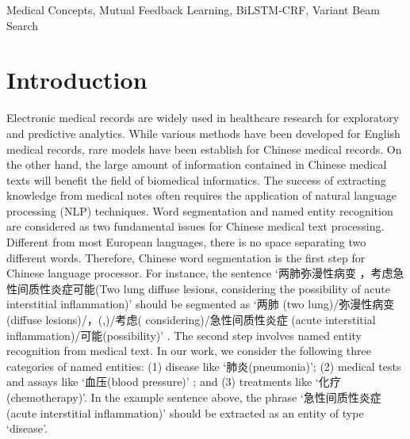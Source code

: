 \documentclass[conference]{IEEEtran}
\begin{document}
\begin{IEEEkeywords}
Medical Concepts, Mutual Feedback Learning, BiLSTM-CRF, Variant Beam Search
\end{IEEEkeywords}

\section{Introduction}
Electronic medical records are widely used in healthcare research for exploratory and predictive analytics\cite{b1}. While various methods have been developed for English medical records, rare models have been establish for Chinese medical records\cite{b2,b3,b4,b5}.  On the other hand, the large amount of information contained in Chinese medical texts will benefit the field of biomedical informatics. The success of extracting knowledge from medical notes often requires the application of natural language processing (NLP) techniques. Word segmentation\cite{b6,b7} and named entity recognition\cite{b8,b9} are considered as two fundamental issues for Chinese medical text processing. Different from most European languages, there is no space separating two different words. Therefore, Chinese word segmentation is the first step for Chinese language processor. For instance, the sentence ‘两肺弥漫性病变 ，考虑急性间质性炎症可能(Two lung diffuse lesions, considering the possibility of acute interstitial inflammation)’ should be segmented as ‘两肺 (two lung)/弥漫性病变(diffuse lesions)/，(,)/考虑( considering)/急性间质性炎症 (acute interstitial inflammation)/可能(possibility)’ . The second step involves named entity recognition from medical text. In our work, we consider the following three categories of named entities: (1) disease like ‘肺炎(pneumonia)’; (2) medical tests and assays like ‘血压(blood pressure)’ ; and (3) treatments like ‘化疗(chemotherapy)’. In the example sentence above, the phrase ‘急性间质性炎症 (acute interstitial inflammation)' should be extracted as an entity of type ‘disease’. 
\end{document}
